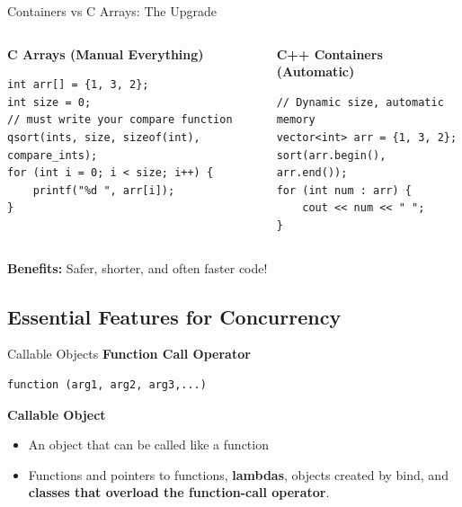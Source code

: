 \begin{frame}[fragile]{Containers vs C Arrays: The Upgrade}
	\begin{columns}
		\begin{column}{0.5\textwidth}
			\textbf{C Arrays (Manual Everything)}
			\begin{verbatim}
int arr[] = {1, 3, 2};
int size = 0;
// must write your compare function
qsort(ints, size, sizeof(int), compare_ints);
for (int i = 0; i < size; i++) {
    printf("%d ", arr[i]);
}
			\end{verbatim}
		\end{column}
		\begin{column}{0.5\textwidth}
			\textbf{C++ Containers (Automatic)}
			\begin{verbatim}
// Dynamic size, automatic memory
vector<int> arr = {1, 3, 2};
sort(arr.begin(), arr.end());
for (int num : arr) {
    cout << num << " ";
}
			\end{verbatim}
		\end{column}
	\end{columns}

	\vspace{0.5em}
	\textbf{Benefits:} Safer, shorter, and often faster code!
\end{frame}

\subsection{Essential Features for Concurrency}
\begin{frame}[fragile]{Callable Objects}
	\textbf{Function Call Operator}
	\begin{verbatim}
function (arg1, arg2, arg3,...)
    \end{verbatim}

	\textbf{Callable Object}
	\begin{itemize}
		\item An object that can be called like a function
		\item Functions and pointers to functions, \textbf{lambdas}, objects created by bind, and \textbf{classes that overload the function-call operator}.
	\end{itemize}
\end{frame}

